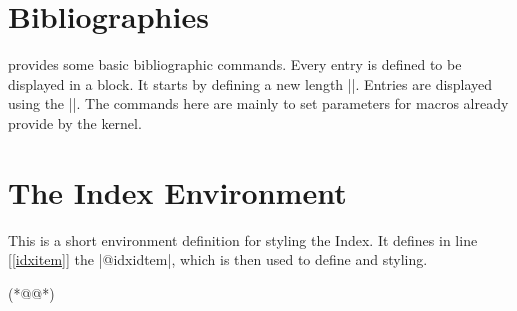 \section*{Bibliographies}

\begin{multicols}{2}
\latex provides some basic bibliographic commands. Every entry is defined to be displayed in a block. It starts by defining a new length |\bibindent|. Entries are displayed using the  |\list|. The commands here are mainly to set parameters for macros already provide by the kernel.
\end{multicols}

\begin{teX}
\newdimen\bibindent
\setlength\bibindent{1.5em}
\newenvironment{thebibliography}[1]
     {\chapter*{\bibname}%
      \@mkboth{\MakeUppercase\bibname}{\MakeUppercase\bibname}%
      \list{\@biblabel{\@arabic\c@enumiv}}%
           {\settowidth\labelwidth{\@biblabel{#1}}%
            \leftmargin\labelwidth
            \advance\leftmargin\labelsep
            \@openbib@code
            \usecounter{enumiv}%
            \let\p@enumiv\@empty
            \renewcommand\theenumiv{\@arabic\c@enumiv}}%
      \sloppy
      \clubpenalty4000
      \@clubpenalty \clubpenalty
      \widowpenalty4000%
      \sfcode`\.\@m}
     {\def\@noitemerr
       {\@latex@warning{Empty `thebibliography' environment}}%
      \endlist}
\newcommand\newblock{\hskip .11em\@plus.33em\@minus.07em}
\let\@openbib@code\@empty
\end{teX}

\section*{The Index Environment}
This is a short environment definition for styling the Index. It defines in line [\ref{idxitem}] the 
|@idxidtem|, which is then used to define  and  styling.

\begin{teX}
\newenvironment{theindex}
   {\if@twocolumn
      \@restonecolfalse
      \else
         \@restonecoltrue
      \fi
      \twocolumn[\@makeschapterhead{\indexname}]%
      \@mkboth{\MakeUppercase\indexname}%
              {\MakeUppercase\indexname}%
                \thispagestyle{plain}\parindent\z@
                \parskip\z@ \@plus .3\p@\relax
                \columnseprule \z@
                \columnsep 35\p@
                \let\item\@idxitem}
      {\if@restonecol\onecolumn\else\clearpage\fi}
\newcommand\@idxitem{\par\hangindent 40\p@} (*@\label{idxitem}@*)
\newcommand\subitem{\@idxitem \hspace*{20\p@}}
\newcommand\subsubitem{\@idxitem \hspace*{30\p@}}
\newcommand\indexspace{\par \vskip 10\p@ \@plus5\p@ \@minus3\p@\relax}
\end{teX}

